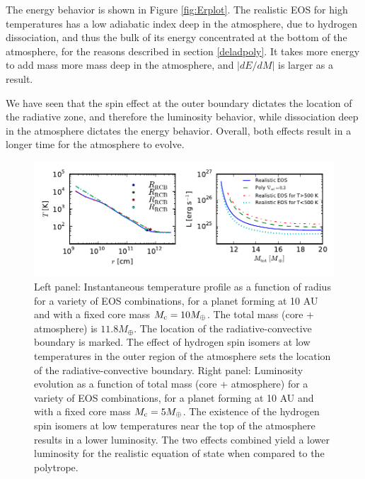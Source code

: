 \documentclass[apj]{emulateapj}
\newcommand{\delad}{\nabla_{\rm ad}}
\begin{document}
The energy behavior is shown in Figure \ref{fig:Erplot}. The realistic EOS for high temperatures has a low adiabatic index deep in the atmosphere, due to hydrogen dissociation, and thus the bulk of its energy concentrated at the bottom of the atmosphere, for the reasons described in section \ref{deladpoly}. It takes more energy to add mass more mass deep in the atmosphere, and $|dE/dM|$ is larger as a result. 
%

We have seen that the spin effect at the outer boundary dictates the location of the radiative zone, and therefore the luminosity behavior, while dissociation deep in the atmosphere dictates the energy behavior. Overall, both effects result in a longer time for the atmosphere to evolve. 


\begin{figure}[tb]
\centering
\includegraphics[width=\textwidth]{../../figs/ModelAtmospheres/RadSelfGravRealEOS/EOSeffects/TLr_plot.pdf}
\caption{Left panel: Instantaneous temperature profile as a function of radius for a variety of EOS combinations, for a planet forming at 10 AU and with a fixed core mass $M_{\rm c}=10 M_{\oplus}$. The total mass (core + atmosphere) is $11.8 M_{\oplus}$. The location of the radiative-convective boundary is marked. The effect of hydrogen spin isomers at low temperatures in the outer region of the atmosphere sets the location of the radiative-convective boundary.  Right panel: Luminosity evolution as a function of total mass (core + atmosphere) for a variety of EOS combinations, for a planet forming at 10 AU and with a fixed core mass $M_{\rm c}=5 M_{\oplus}$. The existence of the hydrogen spin isomers at low temperatures near the top of the atmosphere results in a lower luminosity. The two effects combined yield a lower luminosity for the realistic equation of state when compared to the polytrope. }
\label{fig:TLrplot}
\end{figure}
\end{document}
